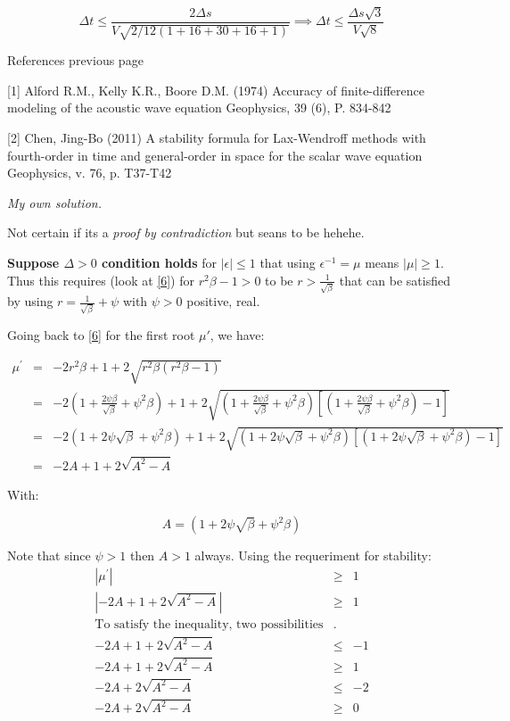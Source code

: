 \documentclass[legalpaper, 12pt]{article}
\begin{document}
$$ \Delta t \leq \frac{2 \Delta s}{ V \sqrt{2/12(1+16+30+16+1)}} \implies \Delta t \leq \frac{ \Delta s \sqrt{3}}{ V \sqrt{8}} $$

\newpage

References previous page

[1] Alford R.M., Kelly K.R., Boore D.M. (1974) Accuracy of finite-difference modeling of the acoustic wave equation Geophysics, 39 (6), P. 834-842

[2] Chen, Jing-Bo (2011) A stability formula for Lax-Wendroff methods with fourth-order in time and general-order in space for the scalar wave equation Geophysics, v. 76, p. T37-T42

\newpage

\textit{My own solution.}

Not certain if its a \textit{proof by contradiction} but seans to be hehehe. 

\textbf{Suppose $ \Delta > 0 $ condition holds} for $ | \epsilon |  \leq 1 $ that using $ \epsilon^{-1} = \mu $ means $ |\mu| \geq 1 $. Thus this requires (look at \ref{6}) for $ r^2 \beta - 1 > 0 $   to be $ r > \frac{1}{ \sqrt{ \beta} } $  that can be satisfied by using $ r = \frac{1}{ \sqrt{ \beta} } + \psi $ with $ \psi > 0 $ positive, real. 

Going back to \ref{6} for the first root $ \mu{'} $, we have:

\begin{eqnarray}
\mu^{'} &=& -2r^2\beta+1 + 2\sqrt{r^2\beta(r^2\beta-1)} \nonumber \\
	&=& -2 \left(1+\frac{2\psi\beta}{\sqrt{\beta}} + \psi^2\beta\right)+1+ 2\sqrt{\left(1+\frac{2\psi\beta}{\sqrt{\beta}} + \psi^2\beta\right)\left[\left(1+\frac{2\psi\beta}{\sqrt{\beta}} + \psi^2\beta\right)-1 \right]} \nonumber \\
	&=& -2 	\left(1+2\psi\sqrt{\beta}+\psi^2\beta\right) +1 + 2 \sqrt{\left(1+2\psi\sqrt{\beta}+\psi^2\beta\right)\left[\left(1+2\psi\sqrt{\beta}+\psi^2\beta\right)-1\right]} \nonumber \\
	&=& -2 A + 1 + 2\sqrt{A^2-A} \label{7}
\end{eqnarray}

With:

\begin{equation}
A = \left(1+2\psi\sqrt{\beta}+\psi^2\beta\right) \label{8}
\end{equation}

Note that since $ \psi > 1 $ then $ A > 1 $ always. Using the requeriment for stability:
\begin{eqnarray}
| \mu^{'} | &\geq& 1 \nonumber \\
	\left|-2 A + 1 + 2\sqrt{A^2-A}\right| &\geq& 1  \nonumber \\
	\text{To satisfy the inequality, two possibilities} &.&\nonumber \\
    -2 A + 1 + 2\sqrt{A^2-A} &\leq& -1  \nonumber \\
	-2 A + 1 + 2\sqrt{A^2-A} &\geq& 1  \nonumber \\ 
	-2 A + 2\sqrt{A^2-A} &\leq& -2  \label{9} \\
    -2 A + 2\sqrt{A^2-A} &\geq& 0  \label{10} 
\end{eqnarray}
\end{document}
